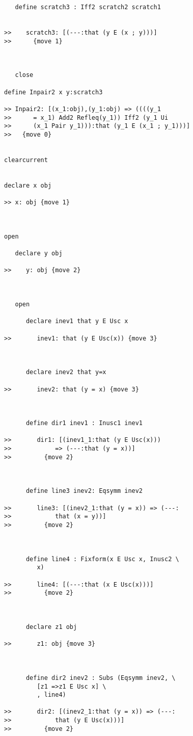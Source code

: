 \documentclass[12pt]{article}
\begin{document}
\begin{verbatim}
   define scratch3 : Iff2 scratch2 scratch1


>>    scratch3: [(---:that (y E (x ; y)))]
>>      {move 1}



   close

define Inpair2 x y:scratch3

>> Inpair2: [(x_1:obj),(y_1:obj) => ((((y_1
>>      = x_1) Add2 Refleq(y_1)) Iff2 (y_1 Ui
>>      (x_1 Pair y_1))):that (y_1 E (x_1 ; y_1)))]
>>   {move 0}


clearcurrent


declare x obj

>> x: obj {move 1}



open

   declare y obj

>>    y: obj {move 2}



   open

      declare inev1 that y E Usc x

>>       inev1: that (y E Usc(x)) {move 3}



      declare inev2 that y=x

>>       inev2: that (y = x) {move 3}



      define dir1 inev1 : Inusc1 inev1

>>       dir1: [(inev1_1:that (y E Usc(x)))
>>            => (---:that (y = x))]
>>         {move 2}



      define line3 inev2: Eqsymm inev2

>>       line3: [(inev2_1:that (y = x)) => (---:
>>            that (x = y))]
>>         {move 2}



      define line4 : Fixform(x E Usc x, Inusc2 \
         x)

>>       line4: [(---:that (x E Usc(x)))]
>>         {move 2}



      declare z1 obj

>>       z1: obj {move 3}



      define dir2 inev2 : Subs (Eqsymm inev2, \
         [z1 =>z1 E Usc x] \
         , line4)

>>       dir2: [(inev2_1:that (y = x)) => (---:
>>            that (y E Usc(x)))]
>>         {move 2}




\end{verbatim}
\end{document}
